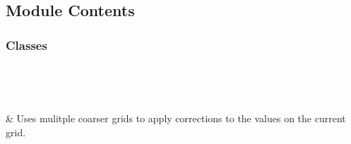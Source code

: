 \documentclass[letterpaper,10pt,english]{sphinxmanual}
\begin{document}
\begin{fulllineitems}

\begin{fulllineitems}
\label{\detokenize{autoapi/Model/index:Model.Model.dim}}
\end{fulllineitems}


\end{fulllineitems}



\section{}
\label{\detokenize{autoapi/MultiGrid/index:module-MultiGrid}}\label{\detokenize{autoapi/MultiGrid/index:multigrid}}\label{\detokenize{autoapi/MultiGrid/index::doc}}

\subsection{Module Contents}
\label{\detokenize{autoapi/MultiGrid/index:module-contents}}

\subsubsection{Classes}
\label{\detokenize{autoapi/MultiGrid/index:classes}}

\begin{savenotes}\sphinxatlongtablestart\begin{longtable}[c]{}
\hline

\endfirsthead

%
{}\\
\hline

\endhead

\hline
{}\\
\endfoot

\endlastfoot

\sphinxAtStartPar
{\hyperref[\detokenize{autoapi/MultiGrid/index:MultiGrid.MultiGrid}]{}}
&
\sphinxAtStartPar
Uses mulitple coarser grids to apply corrections to the values on the current grid.
\\
\hline
\end{longtable}\sphinxatlongtableend\end{savenotes}
\end{document}
